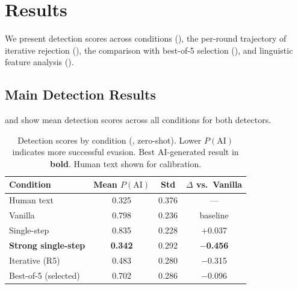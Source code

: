 \section{Results}
\label{sec:results}

We present detection scores across conditions (), the per-round trajectory of iterative rejection (), the comparison with best-of-5 selection (), and linguistic feature analysis ().

\subsection{Main Detection Results}
\label{sec:main_results}

 and  show mean detection scores across all conditions for both detectors.

\begin{table}[t]
\centering
\caption{Detection scores by condition (\binoculars, zero-shot). Lower $P(\text{AI})$ indicates more successful evasion. Best AI-generated result in \textbf{bold}. Human text shown for calibration.}
\label{tab:binoculars_results}
\begin{tabular}{@{}lccc@{}}
\toprule
\textbf{Condition} & \textbf{Mean $P(\text{AI})$} & \textbf{Std} & \textbf{$\Delta$ vs.\ Vanilla} \\
\midrule
Human text & 0.325 & 0.376 & --- \\
\midrule
Vanilla & 0.798 & 0.236 & baseline \\
Single-step & 0.835 & 0.228 & $+$0.037 \\
\textbf{Strong single-step} & \textbf{0.342} & 0.292 & $-$\textbf{0.456} \\
Iterative (R5) & 0.483 & 0.280 & $-$0.315 \\
Best-of-5 (selected) & 0.702 & 0.286 & $-$0.096 \\
\bottomrule
\end{tabular}
\end{table}

